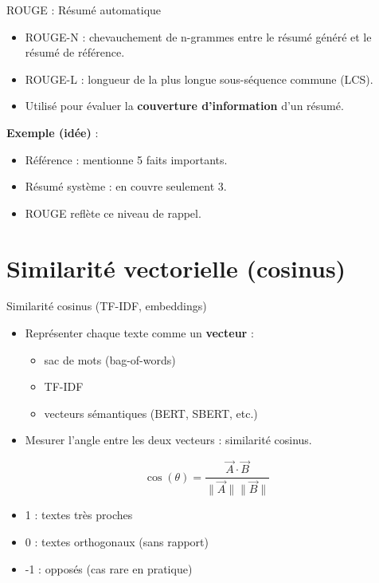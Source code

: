 \documentclass[10pt]{beamer}
\begin{document}
\begin{frame}{ROUGE : Résumé automatique}
  \begin{itemize}
    \item ROUGE-N : chevauchement de n-grammes entre le résumé généré et le résumé de référence.
    \item ROUGE-L : longueur de la plus longue sous-séquence commune (LCS).
    \item Utilisé pour évaluer la \textbf{couverture d'information} d'un résumé.
  \end{itemize}

  \vspace{0.3cm}
  \textbf{Exemple (idée)} :  
  \begin{itemize}
    \item Référence : mentionne 5 faits importants.
    \item Résumé système : en couvre seulement 3.
    \item ROUGE reflète ce niveau de rappel.
  \end{itemize}
\end{frame}

\section{Similarité vectorielle (cosinus)}

\begin{frame}{Similarité cosinus (TF-IDF, embeddings)}
  \begin{itemize}
    \item Représenter chaque texte comme un \textbf{vecteur} :
    \begin{itemize}
      \item sac de mots (bag-of-words)
      \item TF-IDF
      \item vecteurs sémantiques (BERT, SBERT, etc.)
    \end{itemize}
    \item Mesurer l'angle entre les deux vecteurs : similarité cosinus.
  \end{itemize}

  \[
    \cos(\theta) = \frac{\vec{A} \cdot \vec{B}}{\|\vec{A}\|\|\vec{B}\|}
  \]

  \begin{itemize}
    \item 1 : textes très proches
    \item 0 : textes orthogonaux (sans rapport)
    \item -1 : opposés (cas rare en pratique)
  \end{itemize}
\end{frame}
\end{document}
